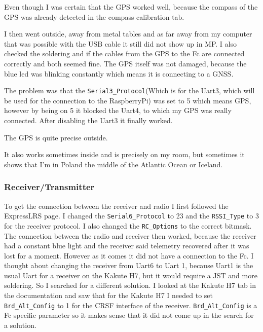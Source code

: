 \documentclass{article}
\begin{document}
	Even though I was certain that the GPS worked well, because the compass of the GPS was already detected in the compass calibration tab.
	
	I then went outside, away from metal tables and as far away from my computer that was possible with the USB cable it still did not show up in MP. I also checked the soldering and if the cables from the GPS to the Fc are connected correctly and both seemed fine. The GPS itself was not damaged, because the blue led was blinking constantly which means it is connecting to a GNSS.

	The problem was that the \lstinline|Serial3_Protocol|(Which is for the Uart3, which will be used for the connection to the RaspberryPi) was set to 5 which means GPS, however by being on 5 it blocked the Uart4, to which my GPS was really connected. After disabling the Uart3 it finally worked.
	
	The GPS is quite precise outside.
	
	It also works sometimes inside and is precisely on my room, but sometimes it shows that I'm in Poland the middle of the Atlantic Ocean or Iceland.
	 
	\subsubsection{Receiver/Transmitter}
	To get the connection between the receiver and radio I first followed the ExpressLRS\cite{expresslrsorg} page. I changed the \lstinline|Serial6_Protocol| to 23 and the \lstinline|RSSI_Type| to 3 for the receiver protocol. I also changed the \lstinline|RC_Options| to the correct bitmask.
	The connection between the radio and receiver then worked, because the receiver had a constant blue light and the receiver said telemetry recovered after it was lost for a moment. However as it comes it did not have a connection to the Fc. I thought about changing the receiver from Uart6 to Uart 1, because Uart1 is the usual Uart for a receiver on the Kakute H7, but it would require a JST and more soldering. So I searched for a different solution. I looked at the Kakute H7 tab in the documentation and saw that for the Kakute H7 I needed to set \lstinline|Brd_Alt_Config| to 1 for the CRSF interface of the receiver. \lstinline|Brd_Alt_Config| is a Fc specific parameter so it makes sense that it did not come up in the search for a solution. 
\end{document}
